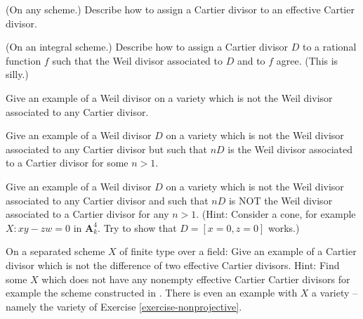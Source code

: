 \begin{exercise}
\label{exercise-effective-cartier-cartier}
(On any scheme.)
Describe how to assign a Cartier divisor to an effective Cartier divisor.
\end{exercise}

\begin{exercise}
\label{exercise-rational-function-cartier}
(On an integral scheme.)
Describe how to assign a Cartier divisor $D$ to a rational function
$f$ such that the Weil divisor associated to $D$ and to $f$ agree.
(This is silly.)
\end{exercise}

\begin{exercise}
\label{exercise-weil-not-cartier}
Give an example of a Weil divisor on a variety which is not
the Weil divisor associated to any Cartier divisor.
\end{exercise}

\begin{exercise}
\label{exercise-weil-Q-cartier}
Give an example of a Weil divisor $D$ on a variety which is not
the Weil divisor associated to any Cartier divisor but
such that $nD$ is the Weil divisor associated to a Cartier
divisor for some $n>1$.
\end{exercise}

\begin{exercise}
\label{exercise-weil-not-Q-cartier}
Give an example of a Weil divisor $D$ on a variety which is not
the Weil divisor associated to any Cartier divisor and
such that $nD$ is NOT the Weil divisor associated to a Cartier
divisor for any $n>1$.
(Hint: Consider a cone, for example $X : xy - zw = 0$ in
$\mathbf{A}^4_k$. Try to show that $D = [x = 0, z = 0]$ works.)
\end{exercise}

\begin{exercise}
\label{exercise-cartier-not-difference-effective-cartier}
On a separated scheme $X$ of finite type over a field:
Give an example of a Cartier divisor which is not the difference of
two effective Cartier divisors.
Hint: Find some $X$ which does not have any nonempty effective Cartier
Cartier divisors for example the scheme constructed in
\cite[III Exercise 5.9]{H}. There is even an example
with $X$ a variety -- namely the variety of
Exercise \ref{exercise-nonprojective}.
\end{exercise}

